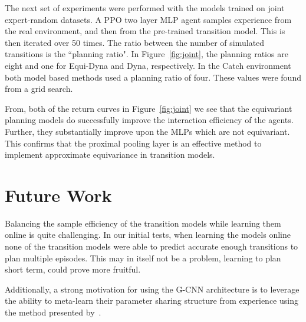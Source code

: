 \documentclass[mlabstract]{jmlr}
\begin{document}
The next set of experiments were performed with the models trained on joint expert-random datasets. A PPO two layer MLP agent samples experience from the real environment, and then from the pre-trained transition model. This is then iterated over 50 times. The ratio between the number of simulated transitions is the ``planning ratio". In Figure~\ref{fig:joint}, the planning ratios are eight and one for Equi-Dyna and Dyna, respectively. In the Catch environment both model based methods used a planning ratio of four. These values were found from a grid search.

From, both of the return curves in Figure~\ref{fig:joint} we see that the equivariant planning models do successfully improve the interaction efficiency of the agents. Further, they substantially improve upon the MLPs which are not equivariant. This confirms that the proximal pooling layer is an effective method to implement approximate equivariance in transition models.

\section{Future Work}
Balancing the sample efficiency of the transition models while learning them online is quite challenging. In our initial tests, when learning the models online none of the transition models were able to predict accurate enough transitions to plan multiple episodes. This may  in itself not be a problem, learning to plan short term, could prove more fruitful.

Additionally, a strong motivation for using the G-CNN architecture is to leverage the ability to meta-learn their parameter sharing structure from experience using the method presented by~\cite{zhou2020meta}.

\newpage



\appendix
\end{document}
